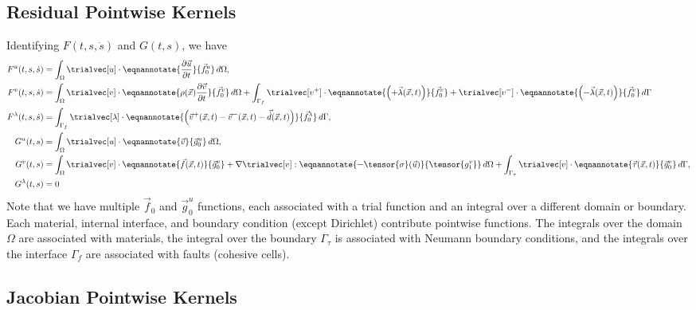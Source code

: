\subsection{Residual Pointwise Kernels}

Identifying $F(t,s,\dot{s})$ and $G(t,s)$, we have
\begin{align}
  F^u(t,s,\dot{s}) &=  \int_\Omega \trialvec[u] \cdot \eqnannotate{\frac{\partial \vec{u}}{\partial t}}{\vec{f}^u_0} \, d\Omega, \\
  F^v(t,s,\dot{s}) &=  \int_\Omega \trialvec[v] \cdot \eqnannotate{\rho(\vec{x}) \frac{\partial \vec{v}}{\partial t}}{\vec{f}^v_0} \, d\Omega
            + \int_{\Gamma_{f}} \trialvec[v^+] \cdot \eqnannotate{\left(+\vec{\lambda}(\vec{x},t)\right)}{\vec{f}^v_0}
                     + \trialvec[v^-] \cdot \eqnannotate{\left(-\vec{\lambda}(\vec{x},t)\right)}{\vec{f}^v_0}\, d\Gamma \\
  F^\lambda(t,s,\dot{s}) &= \int_{\Gamma_{f}} \trialvec[\lambda] \cdot \eqnannotate{\left(
    \vec{v}^+(\vec{x},t) - \vec{v}^-(\vec{x},t) - \vec{\dot{d}}(\vec{x},t) \right)}{\vec{f}^\lambda_0} \, d\Gamma, \\
  G^u(t,s) &= \int_\Omega \trialvec[u] \cdot \eqnannotate{\vec{v}}{\vec{g}^u_0} \, d\Omega, \\
  G^v(t,s) &=  \int_\Omega \trialvec[v] \cdot \eqnannotate{\vec{f}(\vec{x},t)}{\vec{g}^v_0} + \nabla \trialvec[v] : \eqnannotate{-\tensor{\sigma}(\vec{u})}{\tensor{g^v_1}} \, d\Omega
  + \int_{\Gamma_\tau} \trialvec[v] \cdot \eqnannotate{\vec{\tau}(\vec{x},t)}{\vec{g}^v_0} \, d\Gamma, \\
  G^\lambda(t,s) &= 0
\end{align}
Note that we have multiple $\vec{f}_0$ and $\vec{g}_0^u$ functions, each
associated with a trial function and an integral over a different
domain or boundary. Each material, internal interface, and boundary
condition (except Dirichlet) contribute pointwise functions. The
integrals over the domain $\Omega$ are associated with materials, the
integral over the boundary $\Gamma_\tau$ is associated with Neumann
boundary conditions, and the integrals over the interface $\Gamma_{f}$
are associated with faults (cohesive cells).

\subsection{Jacobian Pointwise Kernels}

